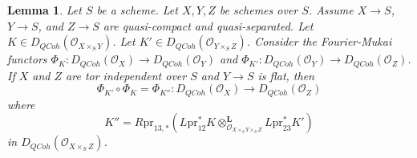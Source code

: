 \documentclass{stacks-project}
\theoremstyle{plain}
\newtheorem{lemma}[subsection]{Lemma}
\theoremstyle{definition}
\theoremstyle{remark}
\numberwithin{equation}{subsection}
\def\QCoh{\mathit{QCoh}}
\begin{document}
\begin{lemma}
\label{lemma-compose-fourier-mukai}
Let $S$ be a scheme. Let $X, Y, Z$ be schemes over $S$. Assume
$X \to S$, $Y \to S$, and $Z \to S$ are quasi-compact and quasi-separated.
Let $K \in D_\QCoh(\mathcal{O}_{X \times_S Y})$.
Let $K' \in D_\QCoh(\mathcal{O}_{Y \times_S Z})$.
Consider the Fourier-Mukai functors
$\Phi_K : D_\QCoh(\mathcal{O}_X) \to D_\QCoh(\mathcal{O}_Y)$
and $\Phi_{K'} : D_\QCoh(\mathcal{O}_Y) \to D_\QCoh(\mathcal{O}_Z)$.
If $X$ and $Z$ are tor independent over $S$ and $Y \to S$ is flat,
then
$$
\Phi_{K'} \circ \Phi_K = \Phi_{K''} :
D_\QCoh(\mathcal{O}_X)
\longrightarrow
D_\QCoh(\mathcal{O}_Z)
$$
where
$$
K'' = R\text{pr}_{13, *}(
L\text{pr}_{12}^*K
\otimes_{\mathcal{O}_{X \times_S Y \times_S Z}}^\mathbf{L}
L\text{pr}_{23}^*K')
$$
in $D_\QCoh(\mathcal{O}_{X \times_S Z})$.
\end{lemma}
\end{document}
